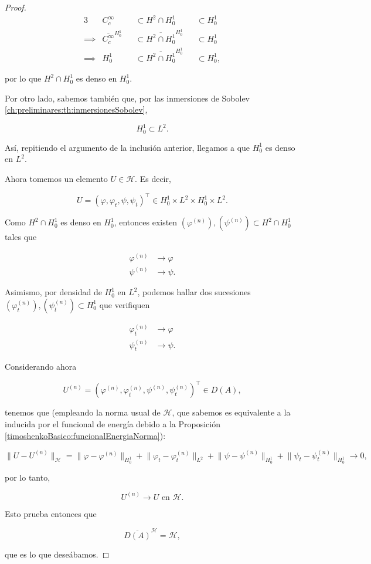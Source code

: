 \begin{proof}
    \begin{alignat*}{3}
        &C_c^{\infty} 
        &&\subset{} H^2 \cap H_0^1 
        &&\subset{} H_0^1\\
        \implies{}& \overline{C_c^{\infty}}^{H^1_0} 
        &&\subset{} \overline{H^2 \cap H_0^1}^{H^1_0} 
        &&\subset{} H_0^1\\
        \implies{}& H^1_0 
        &&\subset{} \overline{H^2 \cap H_0^1}^{H^1_0} 
        &&\subset{} H_0^1,
    \end{alignat*}

    por lo que $H^2 \cap H_0^1$ es denso en $H_0^1$.

    Por otro lado, sabemos también que, por las inmersiones de Sobolev \ref{ch:preliminares:th:inmersionesSobolev},

    \[H_0^1 \subset L^2.\]

    Así, repitiendo el argumento de la inclusión anterior, llegamos a que $H_0^1$ es denso en $L^2$.

    Ahora tomemos un elemento $U \in \mathcal{H}$. Es decir,

    \[U = (\varphi, \varphi_t, \psi, \psi_t)^\top \in H_0^1 \times L^2 \times H_0^1 \times L^2.\]

    Como $H^2 \cap H_0^1$ es denso en $H_0^1$, entonces existen $(\varphi^{(n)}), (\psi^{(n)}) \subset H^2 \cap H_0^1$ tales que

    \begin{align*}
        \varphi^{(n)} &\rightarrow \varphi\\
        \psi^{(n)} & \rightarrow \psi.
    \end{align*}

    Asimismo, por densidad de $H_0^1$ en $L^2$, podemos hallar dos sucesiones $(\varphi_t^{(n)}), (\psi_t^{(n)}) \subset H_0^1$ que verifiquen

    \begin{align*}
        \varphi_t^{(n)} &\rightarrow \varphi\\
        \psi_t^{(n)} & \rightarrow \psi.
    \end{align*}

    Considerando ahora 
    
    \[U^{(n)} = (\varphi^{(n)}, \varphi_t^{(n)}, \psi^{(n)}, \psi_t^{(n)})^\top \in D(A),\]

    tenemos que (empleando la norma usual de $\mathcal{H}$, que sabemos es equivalente a la inducida por el funcional de energía debido a la Proposición \ref{timoshenkoBasico:funcionalEnergiaNorma}):

    \[\lVert U - U^{(n)}\rVert_{\mathcal{H}} = \lVert \varphi - \varphi^{(n)}\rVert_{H_0^1} + \lVert \varphi_t - \varphi_t^{(n)}\rVert_{L^2} + \lVert \psi - \psi^{(n)}\rVert_{H_0^1} + \lVert \psi_t - \psi_t^{(n)}\rVert_{H_0^1} \rightarrow 0,\]

    por lo tanto,

    \[U^{(n)} \rightarrow U \text{ en } \mathcal{H}.\]

    Esto prueba entonces que 

    \[\overline{D(A)}^{\mathcal{H}} = \mathcal{H},\]

    que es lo que deseábamos.
\end{proof}

